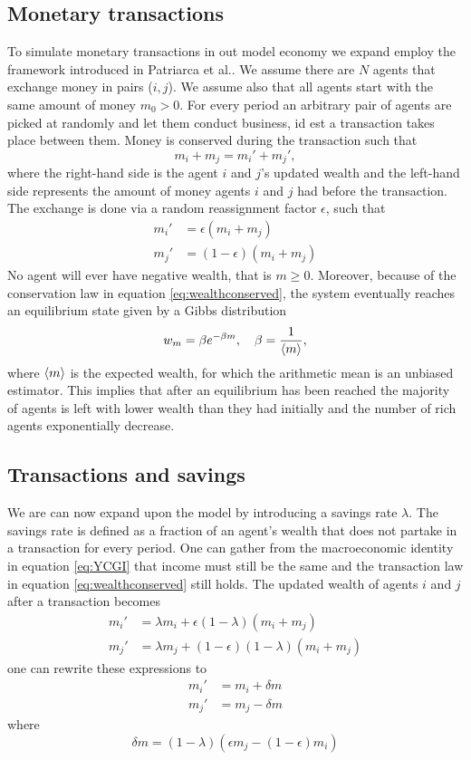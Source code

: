 \documentclass[10pt, a4paper]{amsart}
\begin{document}
\subsection{Monetary transactions}
To simulate monetary transactions in out model economy we expand employ the framework introduced in Patriarca et al.\cite{Patriarca}. We assume there are $N$ agents that exchange money in pairs ($i,j$). We assume also that all agents start with the same amount of money $m_0>0$. For every period an arbitrary pair of agents are picked at randomly and let them conduct business, id est a transaction takes place between them. Money is conserved during the transaction such that
\begin{equation}
\label{eq:wealthconserved}
m_i + m_j = m_i' + m_j',
\end{equation}
where the right-hand side is the agent $i$ and $j$'s updated wealth and the left-hand side represents the amount of money agents $i$ and $j$ had before the transaction. The exchange is done via a random reassignment factor $\epsilon$, such that
\begin{align}
m_i' &= \epsilon (m_i + m_j) \\
m_j' &= (1 - \epsilon) (m_i + m_j)
\end{align}
No agent will ever have negative wealth, that is $m \geq 0$. Moreover, because of the conservation law in equation \ref{eq:wealthconserved}, the system eventually reaches an equilibrium state given by a Gibbs distribution
\begin{equation}
\label{eq:gibbs}
w_m = \beta e^{-\beta m}, \quad \beta = \frac{1}{\ev{m}},
\end{equation}
where $\ev{m}$ is the expected wealth, for which the arithmetic mean is an unbiased estimator. This implies that after an equilibrium has been reached the majority of agents is left with lower wealth than they had initially and
the number of rich agents exponentially decrease.

\subsection{Transactions and savings}
We are can now expand upon the model by introducing a savings rate $\lambda$. The savings rate is defined as a fraction of an agent's wealth that does not partake in a transaction for every period. One can gather from the macroeconomic identity in equation \ref{eq:YCGI} that income must still be the same and the transaction law in equation \ref{eq:wealthconserved} still holds. The updated wealth of agents $i$ and $j$ after a transaction becomes
\begin{align}
m_i' &= \lambda m_i + \epsilon (1 - \lambda) (m_i + m_j) \\
m_j' &= \lambda m_j + (1- \epsilon) (1 - \lambda) (m_i + m_j)
\end{align}
one can rewrite these expressions to
\begin{align*}
m_i' &= m_i + \delta m \\
m_j' &= m_j - \delta m
\end{align*}
where
\begin{equation}
\delta m = (1 - \lambda)(\epsilon m_j - (1 - \epsilon)m_i)
\end{equation}
\end{document}
